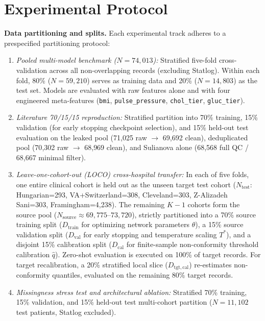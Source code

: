 \documentclass[journal]{IEEEtran}
\begin{document}
\section{Experimental Protocol}\label{sec:protocol}
\textbf{Data partitioning and splits.} Each experimental track adheres to a prespecified partitioning protocol:
\begin{enumerate}
\item \emph{Pooled multi-model benchmark ($N=74{,}013$):} Stratified five-fold cross-validation across all non-overlapping records (excluding Statlog). Within each fold, 80\% ($N=59{,}210$) serves as training data and 20\% ($N=14{,}803$) as the test set. Models are evaluated with raw features alone and with four engineered meta-features (\texttt{bmi}, \texttt{pulse\_pressure}, \texttt{chol\_tier}, \texttt{gluc\_tier}).
\item \emph{Literature 70/15/15 reproduction:} Stratified partition into 70\% training, 15\% validation (for early stopping checkpoint selection), and 15\% held-out test evaluation on the leaked pool (71{,}025 raw $\rightarrow$ 69{,}692 clean), deduplicated pool (70{,}302 raw $\rightarrow$ 68{,}969 clean), and Sulianova alone (68{,}568 full QC / 68{,}667 minimal filter).
\item \emph{Leave-one-cohort-out (LOCO) cross-hospital transfer:} In each of five folds, one entire clinical cohort is held out as the unseen target test cohort ($N_{\mathrm{test}}$: Hungarian=293, VA+Switzerland=308, Cleveland=303, Z-Alizadeh Sani=303, Framingham=4{,}238). The remaining $K-1$ cohorts form the source pool ($N_{\mathrm{source}}\approx 69{,}775$--$73{,}720$), strictly partitioned into a 70\% source training split ($D_{\mathrm{train}}$ for optimizing network parameters $\theta$), a 15\% source validation split ($D_{\mathrm{val}}$ for early stopping and temperature scaling $T^*$), and a disjoint 15\% calibration split ($D_{\mathrm{cal}}$ for finite-sample non-conformity threshold calibration $\hat{q}$). Zero-shot evaluation is executed on 100\% of target records. For target recalibration, a 20\% stratified local slice ($D_{\mathrm{tgt,cal}}$) re-estimates non-conformity quantiles, evaluated on the remaining 80\% target records.
\item \emph{Missingness stress test and architectural ablation:} Stratified 70\% training, 15\% validation, and 15\% held-out test multi-cohort partition ($N=11{,}102$ test patients, Statlog excluded).
\end{enumerate}
\end{document}
